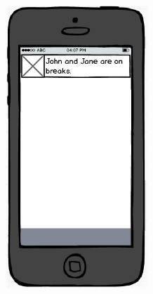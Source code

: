 \documentclass[11pt,a4paper]{report}
\begin{document}
\medskip
\centering
\includegraphics[width=0.4\textwidth]{Mobile.png}
\end{document}
